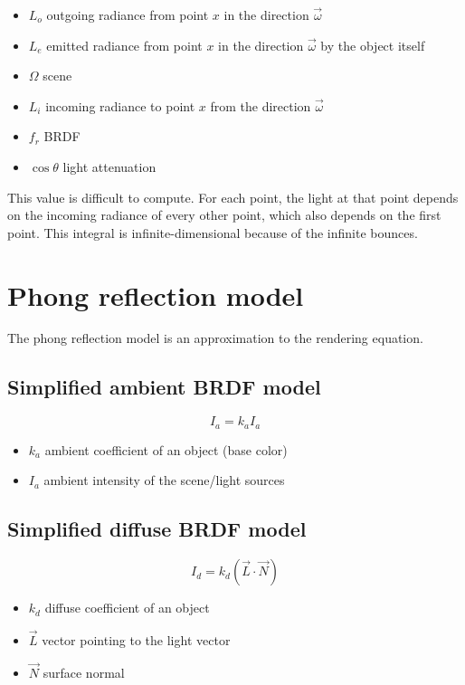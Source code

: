 \documentclass[a4paper]{article}
\begin{document}
\begin{itemize}
    \item \(L_o\) outgoing radiance from point \(x\) in the direction \(\vec{\omega}\)
    \item \(L_e\) emitted radiance from point \(x\) in the direction \(\vec{\omega}\) by the object itself
    \item \(\Omega\) scene
    \item \(L_i\) incoming radiance to point \(x\) from the direction \(\vec{\omega}\)
    \item \(f_r\) BRDF
    \item \(\cos \theta\) light attenuation
\end{itemize}

This value is difficult to compute. For each point, the light at that point
depends on the incoming radiance of every other point, which also depends on the first point.
This integral is infinite-dimensional because of the infinite bounces.

\section{Phong reflection model}

The phong reflection model is an approximation
to the rendering equation.

\subsection{Simplified ambient BRDF model}

\[
    I_a=k_a I_a
\]
\begin{itemize}
    \item \(k_a\) ambient coefficient of an object (base color)
    \item \(I_a\) ambient intensity of the scene/light sources
\end{itemize}

\subsection{Simplified diffuse BRDF model}

\[
    I_d=k_d (\vec{L} \cdot \vec{N})
\]

\begin{itemize}
    \item \(k_d\) diffuse coefficient of an object
    \item \(\vec{L}\) vector pointing to the light vector
    \item \(\vec{N}\) surface normal
\end{itemize}
\end{document}
